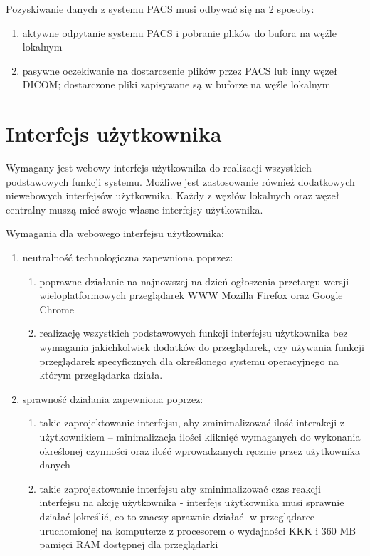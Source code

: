 \documentclass[a4paper]{report}
\begin{document}
Pozyskiwanie danych z systemu PACS musi odbywać się na 2 sposoby:
\begin{enumerate}
  \item aktywne odpytanie systemu PACS i pobranie plików do bufora na węźle lokalnym
  \item pasywne oczekiwanie na dostarczenie plików przez PACS lub inny węzeł DICOM; dostarczone pliki zapisywane są w buforze na węźle lokalnym
\end{enumerate}

\section{Interfejs użytkownika}

Wymagany jest webowy interfejs użytkownika do realizacji wszystkich podstawowych funkcji systemu. Możliwe jest zastosowanie również dodatkowych niewebowych interfejsów użytkownika. Każdy z węzłów lokalnych oraz węzeł centralny muszą mieć swoje własne interfejsy użytkownika.

Wymagania dla webowego interfejsu użytkownika:

\begin{enumerate}
    \item neutralność technologiczna zapewniona poprzez:
	  \begin{enumerate}
	  \item poprawne działanie na najnowszej na dzień ogłoszenia przetargu wersji wieloplatformowych przeglądarek WWW Mozilla Firefox oraz Google Chrome
	  \item realizację wszystkich podstawowych funkcji interfejsu użytkownika bez wymagania jakichkolwiek dodatków do przeglądarek, czy używania funkcji przeglądarek specyficznych dla określonego systemu operacyjnego na którym przeglądarka działa.
	  \end{enumerate}
    \item sprawność działania zapewniona poprzez:
	  \begin{enumerate}
	  \item takie zaprojektowanie interfejsu, aby zminimalizować ilość interakcji z użytkownikiem -- minimalizacja ilości kliknięć wymaganych do wykonania określonej czynności oraz ilość wprowadzanych ręcznie przez użytkownika danych
	  \item takie zaprojektowanie interfejsu aby zminimalizować czas reakcji interfejsu na akcję użytkownika - interfejs użytkownika musi sprawnie działać [określić, co to znaczy sprawnie działać] w przeglądarce uruchomionej na komputerze z procesorem o wydajności KKK i 360 MB pamięci RAM dostępnej dla przeglądarki
	  \end{enumerate}
\end{enumerate}
\end{document}
